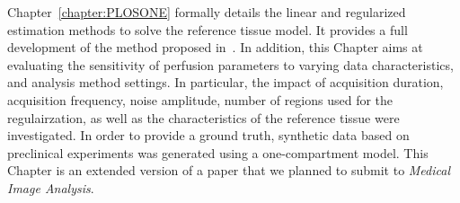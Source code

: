 Chapter~\ref{chapter:PLOSONE} formally details the linear and regularized estimation methods to solve the reference tissue model.
It provides a full development of the method proposed in~\cite{Doury:2017fz}.
In addition, this Chapter aims at evaluating the sensitivity of perfusion parameters to varying data characteristics, and analysis method settings.
In particular, the impact of acquisition duration, acquisition frequency, noise amplitude, number of regions used for the regulairzation, as well as the characteristics of the reference tissue were investigated.
In order to provide a ground truth, synthetic data based on preclinical experiments was generated using a one-compartment model.
This Chapter is an extended version of a paper that we planned to submit to {\em Medical Image Analysis}.

